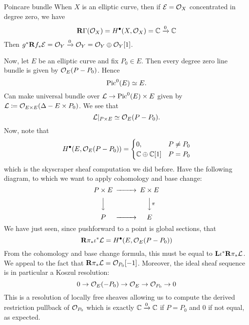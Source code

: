 \begin{example}{Poincare bundle}{}
    When $X$ is an elliptic curve, then if $\mathcal{E}=\mathcal{O}_X$ concentrated in degree zero, we have
\begin{equation*}
    \operatorname{\mathbf{R}\Gamma}(\mathcal{O}_X)=H^\bullet(X,\mathcal{O}_X) = \mathbb{C}\xrightarrow{0}\mathbb{C}
\end{equation*}
Then $g^*\mathbf{R} f_*\mathcal{E} = \mathcal{O}_Y\xrightarrow{0}\mathcal{O}_Y = \mathcal{O}_Y\oplus\mathcal{O}_Y[1]$.

Now, let $E$ be an elliptic curve and fix $P_0\in E$. Then every degree zero line bundle is given by $\mathcal{O}_E(P-P_0)$. Hence
\begin{equation*}
    \operatorname{Pic}^0(E)\simeq E.
\end{equation*}
Can make universal bundle over $\mathcal{L}\to\operatorname{Pic}^0(E)\times E$ given by $\mathcal{L}\coloneqq\mathcal{O}_{E\times E}(\Delta-E\times P_0)$. We see that
\begin{equation*}
    \mathcal{L}|_{P\times E}\simeq \mathcal{O}_E(P-P_0).
\end{equation*}
Now, note that
\begin{equation*}
    H^\bullet(E,\mathcal{O}_E(P-P_0))
        = \begin{cases}
            0, & P\neq P_{0} \\
            \mathbb{C}\oplus\mathbb{C}[1] & P=P_{0}
        \end{cases}
\end{equation*}
which is the skyscraper sheaf computation we did before.
Have the following diagram, to which we want to apply cohomology and base change:
\begin{equation*}
    \begin{CD}
        P\times E @>>> E\times E \\
          @VVV @VV\pi V \\
        P @>>> E
    \end{CD}
\end{equation*}
We have just seen, since pushforward to a point is global sections, that
\begin{equation*}
    \mathbf{R}\pi_*\iota^*\mathcal{L} = H^\bullet(E,\mathcal{O}_E(P-P_0))
\end{equation*}
From the cohomology and base change formula, this must be equal to $\mathbf{L}\iota^*\mathbf{R}\pi_*\mathcal{L}$. We appeal to the fact that $\mathbf{R}\pi_*\mathcal{L}=\mathcal{O}_{P_0}[-1]$. Moreover, the ideal sheaf sequence is in particular a Koszul resolution:
\begin{equation*}
    0\to\mathcal{O}_E(-P_0)\to\mathcal{O}_E\to\mathcal{O}_{P_0}\to 0
\end{equation*}
This is a resolution of locally free sheaves allowing us to compute the derived restriction pullback of $\mathcal{O}_{P_0}$ which is exactly $\mathbb{C}\xrightarrow{0}\mathbb{C}$ if $P=P_0$ and $0$ if not equal, as expected.


\end{example}

